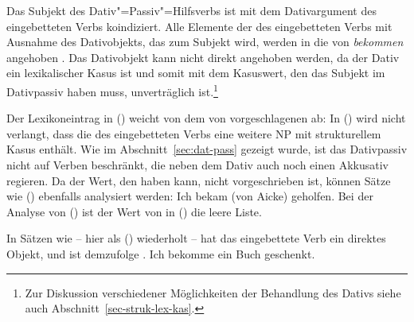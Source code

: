 \noindent
Das Subjekt des Dativ"=Passiv"=Hilfsverbs ist mit dem Dativargument des eingebetteten Verbs
koindiziert. Alle Elemente der \compsl des eingebetteten Verbs mit Ausnahme des Dativobjekts, das
zum Subjekt wird, werden in die \compsl von \emph{bekommen} angehoben . Das Dativobjekt kann nicht direkt angehoben werden, da der Dativ ein lexikalischer Kasus
ist und somit mit dem Kasuswert, den das Subjekt im Dativpassiv haben muss, unverträglich
ist.\footnote{Zur Diskussion verschiedener Möglichkeiten der Behandlung des Dativs siehe auch Abschnitt~\ref{sec-struk-lex-kas}.}

Der Lexikoneintrag in () weicht von dem von \citet[]{HM94a} vorgeschlagenen ab:
In () wird nicht verlangt, dass die \compsl des eingebetteten Verbs eine weitere NP mit
strukturellem Kasus enthält. Wie im Abschnitt~\ref{sec:dat-pass} gezeigt wurde, ist das Dativpassiv nicht auf Verben
beschränkt, die neben dem Dativ auch noch einen Akkusativ regieren. Da der Wert, den  
haben kann, nicht vorgeschrieben ist, können Sätze wie () ebenfalls analysiert werden:
\ea{}
Ich bekam (von Aicke) geholfen.
\z
Bei der Analyse von () ist der Wert von  in () die leere Liste.

In Sätzen wie  -- hier als () wiederholt -- 
hat das eingebettete Verb ein direktes Objekt, und  ist demzufolge .
\ea\label{ex-ich-bekommen-ein-buch-geschenkt-zwei} 
Ich     bekomme ein Buch       geschenkt.
\z

%


